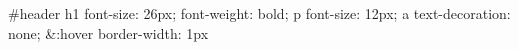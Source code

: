 #header {
  h1 {
    font-size: 26px;
    font-weight: bold;}
  p { font-size: 12px;
    a { text-decoration: none;
      &:hover { border-width: 1px }}}
}